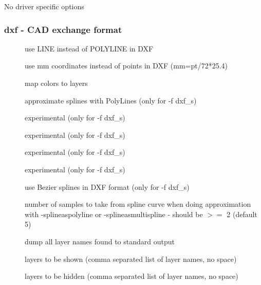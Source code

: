 \documentclass[english,a4paper]{article}
\begin{document}
No driver specific options
\subsubsection{dxf - CAD exchange format}
\begin{description}
\item[]
use LINE instead of POLYLINE in DXF


\item[]
use mm coordinates instead of points in DXF (mm=pt/72*25.4)


\item[]
map colors to layers


\item[]
approximate splines with PolyLines (only for -f dxf\_s)


\item[]
experimental (only for -f dxf\_s)


\item[]
experimental (only for -f dxf\_s)


\item[]
experimental (only for -f dxf\_s)


\item[]
experimental (only for -f dxf\_s)


\item[]
use Bezier splines in DXF format (only for -f dxf\_s)


\item[]
number of samples to take from spline curve when doing approximation with -splineaspolyline or -splineasmultispline - should be $>=$ 2 (default 5)


\item[]
dump all layer names found to standard output


\item[]
layers to be shown (comma separated list of layer names, no space)


\item[]
layers to be hidden (comma separated list of layer names, no space)


\end{description}
\end{document}
